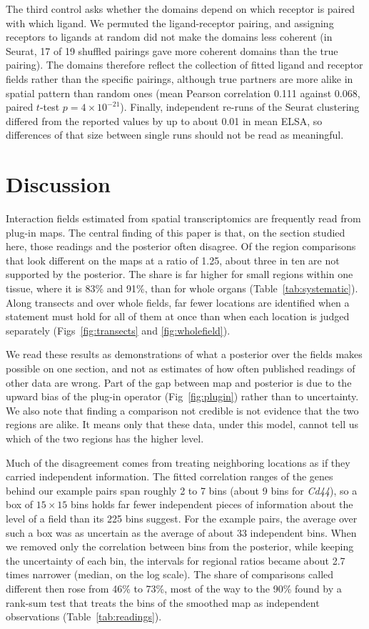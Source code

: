 \documentclass[10pt,letterpaper]{article}
\begin{document}
The third control asks whether the domains depend on which receptor is paired with which ligand. We permuted the ligand-receptor pairing, and assigning receptors to ligands at random did not make the domains less coherent (in Seurat, 17 of 19 shuffled pairings gave more coherent domains than the true pairing). The domains therefore reflect the collection of fitted ligand and receptor fields rather than the specific pairings, although true partners are more alike in spatial pattern than random ones (mean Pearson correlation 0.111 against 0.068, paired $t$-test $p = 4\times10^{-21}$). Finally, independent re-runs of the Seurat clustering differed from the reported values by up to about 0.01 in mean ELSA, so differences of that size between single runs should not be read as meaningful.

\section*{Discussion}\label{sec:discussion}

Interaction fields estimated from spatial transcriptomics are frequently read from plug-in maps. The central finding of this paper is that, on the section studied here, those readings and the posterior often disagree. Of the region comparisons that look different on the maps at a ratio of 1.25, about three in ten are not supported by the posterior. The share is far higher for small regions within one tissue, where it is 83\% and 91\%, than for whole organs (Table~\ref{tab:systematic}). Along transects and over whole fields, far fewer locations are identified when a statement must hold for all of them at once than when each location is judged separately (Figs~\ref{fig:transects} and \ref{fig:wholefield}).

We read these results as demonstrations of what a posterior over the fields makes possible on one section, and not as estimates of how often published readings of other data are wrong. Part of the gap between map and posterior is due to the upward bias of the plug-in operator (Fig~\ref{fig:plugin}) rather than to uncertainty. We also note that finding a comparison not credible is not evidence that the two regions are alike. It means only that these data, under this model, cannot tell us which of the two regions has the higher level.

Much of the disagreement comes from treating neighboring locations as if they carried independent information. The fitted correlation ranges of the genes behind our example pairs span roughly 2 to 7 bins (about 9 bins for \textit{Cd44}), so a box of $15\times15$ bins holds far fewer independent pieces of information about the level of a field than its 225 bins suggest. For the example pairs, the average over such a box was as uncertain as the average of about 33 independent bins. When we removed only the correlation between bins from the posterior, while keeping the uncertainty of each bin, the intervals for regional ratios became about 2.7 times narrower (median, on the log scale). The share of comparisons called different then rose from 46\% to 73\%, most of the way to the 90\% found by a rank-sum test that treats the bins of the smoothed map as independent observations (Table~\ref{tab:readings}).
\end{document}
